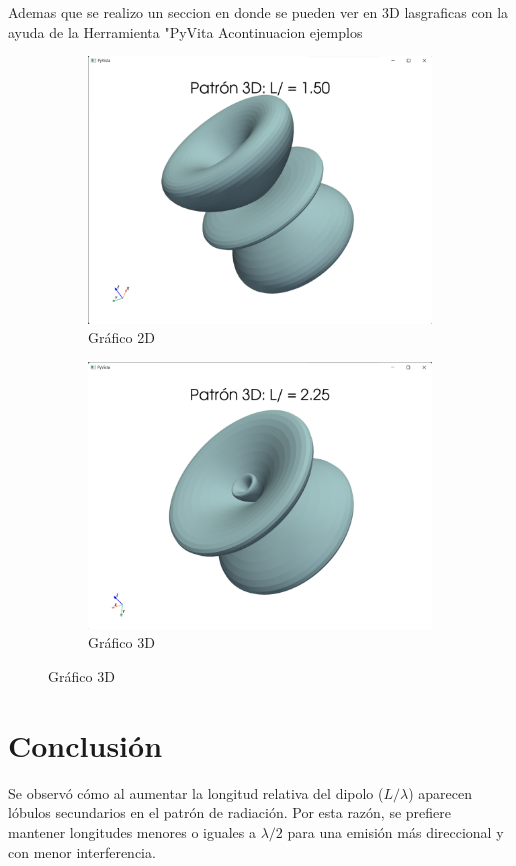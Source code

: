 
Ademas que se realizo un seccion en donde se pueden ver en 3D lasgraficas con la ayuda de la Herramienta "PyVita
Acontinuacion ejemplos 
  \begin{figure}
    \centering
    \begin{subfigure}[b]{0.45\textwidth}
        \includegraphics[width=\textwidth]{Imagenes3D/Vita1.png}
        \caption{Gráfico 2D}
    \end{subfigure}
    \begin{subfigure}[b]{0.45\textwidth}
        \includegraphics[width=\textwidth]{Imagenes3D/Vita_2.png}
        \caption{Gráfico 3D}
    \end{subfigure}
  \end{figure}

\section*{Conclusión}
Se observó cómo al aumentar la longitud relativa del dipolo ($L/\lambda$) aparecen lóbulos secundarios en el patrón de radiación. Por esta razón, se prefiere mantener longitudes menores o iguales a $\lambda/2$ para una emisión más direccional y con menor interferencia.



